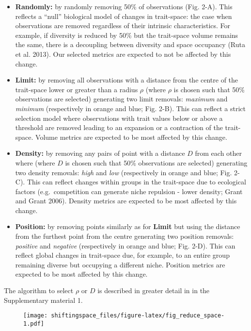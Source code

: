 \documentclass[]{article}
\begin{document}
\begin{itemize}
\item
  \textbf{Randomly:} by randomly removing 50\% of observations (Fig.
  2-A). This reflects a ``null'' biological model of changes in
  trait-space: the case when observations are removed regardless of
  their intrinsic characteristics. For example, if diversity is reduced
  by 50\% but the trait-space volume remains the same, there is a
  decoupling between diversity and space occupancy (Ruta et al. 2013).
  Our selected metrics are expected to not be affected by this change.
\item
  \textbf{Limit:} by removing all observations with a distance from the
  centre of the trait-space lower or greater than a radius \(\rho\)
  (where \(\rho\) is chosen such that 50\% observations are selected)
  generating two limit removals: \emph{maximum} and \emph{minimum}
  (respectively in orange and blue; Fig. 2-B). This can reflect a strict
  selection model where observations with trait values below or above a
  threshold are removed leading to an expansion or a contraction of the
  trait-space. Volume metrics are expected to be most affected by this
  change.
\item
  \textbf{Density:} by removing any pairs of point with a distance \(D\)
  from each other where (where \(D\) is chosen such that 50\%
  observations are selected) generating two density removals:
  \emph{high} and \emph{low} (respectively in orange and blue; Fig.
  2-C). This can reflect changes within groups in the trait-space due to
  ecological factors (e.g.~competition can generate niche repulsion -
  lower density; Grant and Grant 2006). Density metrics are expected to
  be most affected by this change.
\item
  \textbf{Position:} by removing points similarly as for \textbf{Limit}
  but using the distance from the furthest point from the centre
  generating two position removals: \emph{positive} and \emph{negative}
  (respectively in orange and blue; Fig. 2-D). This can reflect global
  changes in trait-space due, for example, to an entire group remaining
  diverse but occupying a different niche. Position metrics are expected
  to be most affected by this change.
\end{itemize}

The algorithm to select \(\rho\) or \(D\) is described in greater detail
in in the Supplementary material 1.

\begin{figure}
\centering
\texttt{[image: shiftingspace\_files/figure-latex/fig\_reduce\_space-1.pdf]}
\caption{}
\end{figure}
\end{document}
